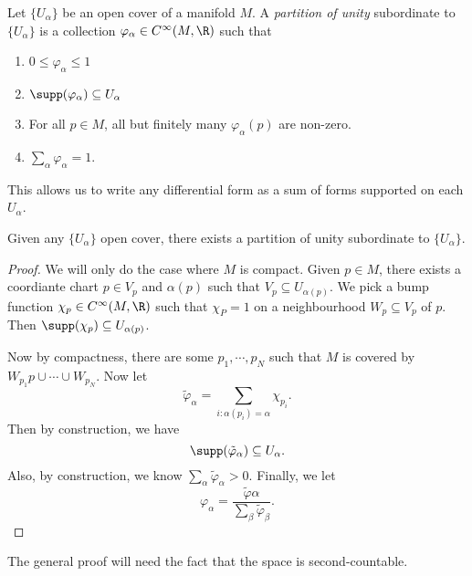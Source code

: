 \documentclass[a4paper]{article}
\begin{document}
\begin{defi}
  Let $\{U_\alpha\}$ be an open cover of a manifold $M$. A \emph{partition of unity} subordinate to $\{U_\alpha\}$ is a collection $\varphi_\alpha \in C^\infty(M, \R)$ such that
  \begin{enumerate}
    \item $0 \leq \varphi_\alpha \leq 1$
    \item $\supp(\varphi_\alpha) \subseteq U_\alpha$
    \item For all $p \in M$, all but finitely many $\varphi_\alpha(p)$ are non-zero.
    \item $\sum_\alpha \varphi_\alpha = 1$.
  \end{enumerate}
\end{defi}
This allows us to write any differential form as a sum of forms supported on each $U_\alpha$.

\begin{thm}
  Given any $\{U_\alpha\}$ open cover, there exists a partition of unity subordinate to $\{U_\alpha\}$.
\end{thm}

\begin{proof}
  We will only do the case where $M$ is compact. Given $p \in M$, there exists a coordiante chart $p \in V_p$ and $\alpha(p)$ such that $V_p \subseteq U_{\alpha(p)}$. We pick a bump function $\chi_p \in C^\infty(M, \R)$ such that $\chi_P = 1$ on a neighbourhood $W_p \subseteq V_p$ of $p$. Then $\supp(\chi_p) \subseteq U_{\alpha(p)}$.

  Now by compactness, there are some $p_1, \cdots, p_N$ such that $M$ is covered by $W_{p_1}p \cup \cdots \cup W_{p_N}$. Now let
  \[
    \tilde{\varphi}_\alpha = \sum_{i: \alpha(p_i) = \alpha} \chi_{p_i}.
  \]
  Then by construction, we have
  \[
    \supp(\tilde{\varphi}_\alpha) \subseteq U_\alpha.
  \]
  Also, by construction, we know $\sum_\alpha \tilde{\varphi}_\alpha > 0$. Finally, we let
  \[
    \varphi_\alpha = \frac{\tilde{\varphi}\alpha}{\sum_\beta \tilde{\varphi}_\beta}.
  \]
\end{proof}
The general proof will need the fact that the space is second-countable.
\end{document}

